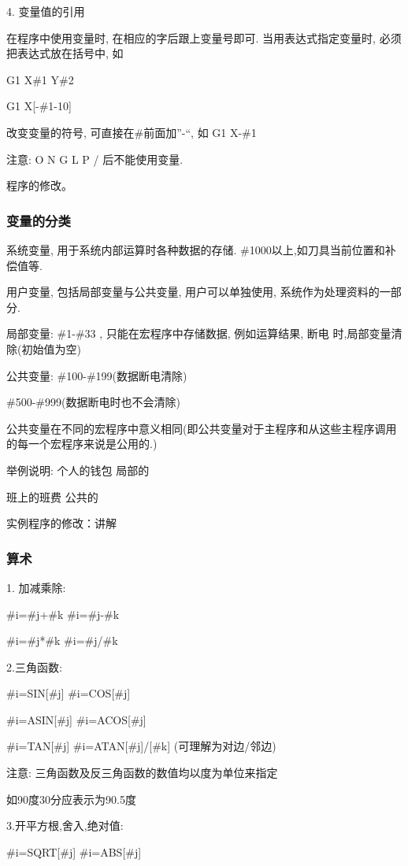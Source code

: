 	4. 变量值的引用

	在程序中使用变量时, 在相应的字后跟上变量号即可. 当用表达式指定变量时, 必须把表达式放在括号中, 如

	G1 X\#1 Y\#2

	G1 X[-\#1-10] 


	改变变量的符号, 可直接在\#前面加”-“, 如 G1 X-\#1

	注意: O N G L P / 后不能使用变量.

	程序的修改。

\subsubsection{变量的分类}

	系统变量, 用于系统内部运算时各种数据的存储. \#1000以上,如刀具当前位置和补偿值等.

	用户变量, 包括局部变量与公共变量, 用户可以单独使用, 系统作为处理资料的一部分.

	局部变量: \#1-\#33 , 只能在宏程序中存储数据, 例如运算结果, 断电
	时,局部变量清除(初始值为空)

	公共变量: \#100-\#199(数据断电清除)

	\#500-\#999(数据断电时也不会清除)

	公共变量在不同的宏程序中意义相同(即公共变量对于主程序和从这些主程序调用的每一个宏程序来说是公用的.)

	举例说明:  个人的钱包   局部的

	班上的班费   公共的

	实例程序的修改：讲解

\subsubsection{算术}

	1. 加减乘除:

	\#i=\#j+\#k           \#i=\#j-\#k
	
\#i=\#j*\#k           \#i=\#j/\#k

2.三角函数:

\#i=SIN[\#j]          \#i=COS[\#j]

\#i=ASIN[\#j]         \#i=ACOS[\#j]

\#i=TAN[\#j]         \#i=ATAN[\#j]/[\#k] (可理解为对边/邻边)

注意: 三角函数及反三角函数的数值均以度为单位来指定

如90度30分应表示为90.5度

3.开平方根,舍入,绝对值:

\#i=SQRT[\#j]        \#i=ABS[\#j]

